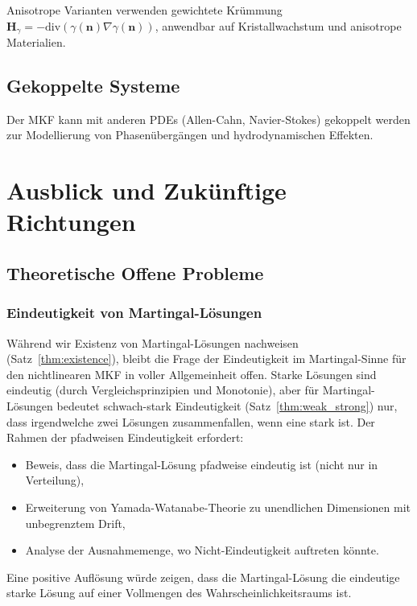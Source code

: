 \documentclass[a4paper,12pt]{article}
\theoremstyle{definition}
\begin{document}
Anisotrope Varianten verwenden gewichtete Krümmung $\mathbf{H}_\gamma = -\text{div}(\gamma(\mathbf{n})\nabla\gamma(\mathbf{n}))$, anwendbar auf Kristallwachstum und anisotrope Materialien.

\subsection{Gekoppelte Systeme}

Der MKF kann mit anderen PDEs (Allen-Cahn, Navier-Stokes) gekoppelt werden zur Modellierung von Phasenübergängen und hydrodynamischen Effekten.

\section{Ausblick und Zukünftige Richtungen}
\label{sec:outlook}

\subsection{Theoretische Offene Probleme}

\subsubsection{Eindeutigkeit von Martingal-Lösungen}

Während wir Existenz von Martingal-Lösungen nachweisen (Satz~\ref{thm:existence}), bleibt die Frage der Eindeutigkeit im Martingal-Sinne für den nichtlinearen MKF in voller Allgemeinheit offen. Starke Lösungen sind eindeutig (durch Vergleichsprinzipien und Monotonie), aber für Martingal-Lösungen bedeutet schwach-stark Eindeutigkeit (Satz~\ref{thm:weak_strong}) nur, dass irgendwelche zwei Lösungen zusammenfallen, wenn eine stark ist. Der Rahmen der pfadweisen Eindeutigkeit erfordert:

\begin{itemize}
	\item Beweis, dass die Martingal-Lösung pfadweise eindeutig ist (nicht nur in Verteilung),
	\item Erweiterung von Yamada-Watanabe-Theorie zu unendlichen Dimensionen mit unbegrenztem Drift,
	\item Analyse der Ausnahmemenge, wo Nicht-Eindeutigkeit auftreten könnte.
\end{itemize}

Eine positive Auflösung würde zeigen, dass die Martingal-Lösung die eindeutige starke Lösung auf einer Vollmengen des Wahrscheinlichkeitsraums ist.
\end{document}

